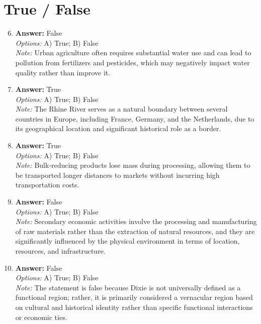 \documentclass[12pt]{article}
\begin{document}
\section*{True / False}
\begin{enumerate}[label=\arabic*.]
\setcounter{enumi}{5}
\item \textbf{Answer:} False
\\ \textit{Options:} A) True; B) False
\\ \textit{Note:} Urban agriculture often requires substantial water use and can lead to pollution from fertilizers and pesticides, which may negatively impact water quality rather than improve it.
\item \textbf{Answer:} True
\\ \textit{Options:} A) True; B) False
\\ \textit{Note:} The Rhine River serves as a natural boundary between several countries in Europe, including France, Germany, and the Netherlands, due to its geographical location and significant historical role as a border.
\item \textbf{Answer:} True
\\ \textit{Options:} A) True; B) False
\\ \textit{Note:} Bulk-reducing products lose mass during processing, allowing them to be transported longer distances to markets without incurring high transportation costs.
\item \textbf{Answer:} False
\\ \textit{Options:} A) True; B) False
\\ \textit{Note:} Secondary economic activities involve the processing and manufacturing of raw materials rather than the extraction of natural resources, and they are significantly influenced by the physical environment in terms of location, resources, and infrastructure.
\item \textbf{Answer:} False
\\ \textit{Options:} A) True; B) False
\\ \textit{Note:} The statement is false because Dixie is not universally defined as a functional region; rather, it is primarily considered a vernacular region based on cultural and historical identity rather than specific functional interactions or economic ties.
\end{enumerate}
\end{document}
